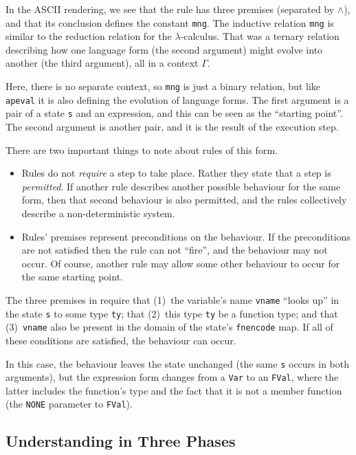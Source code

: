 \documentclass[11pt]{article}
\begin{document}
In the ASCII rendering, we see that the rule has three premises
(separated by $\land$), and that its conclusion defines the constant
\texttt{mng}.  The inductive relation \texttt{mng} is similar to the
reduction relation for the $\lambda$-calculus. That was a ternary
relation describing how one language form (the second argument) might
evolve into another (the third argument), all in a context $\Gamma$.

Here, there is no separate context, so \texttt{mng} is just a binary
relation, but like \texttt{apeval} it is also defining the evolution
of language forms.  The first argument is a pair of a state \texttt{s}
and an expression, and this can be seen as the ``starting point''.  The
second argument is another pair, and it is the result of the execution
step.

There are two important things to note about rules of this form.
\begin{itemize}
\item Rules do not \emph{require} a step to take place.  Rather they
  state that a step is \emph{permitted}.  If another rule describes
  another possible behaviour for the same form, then that second
  behaviour is also permitted, and the rules collectively describe a
  non-deterministic system.
\item Rules' premises represent preconditions on the behaviour.  If
  the preconditions are not satisfied then the rule can not ``fire'',
  and the behaviour may not occur.  Of course, another rule may allow
  some other behaviour to occur for the same starting point.
\end{itemize}

The three premises in  require that (1)~the
variable's name \texttt{vname} ``looks up'' in the state \texttt{s} to
some type \texttt{ty}; that (2)~this type \texttt{ty} be a function
type; and that (3)~\texttt{vname} also be present in the domain of the
state's \texttt{fnencode} map.  If all of these conditions are
satisfied, the behaviour can occur.

In this case, the behaviour leaves the state unchanged (the same
\texttt{s} occurs in both arguments), but the expression form changes
from a \texttt{Var} to an \texttt{FVal}, where the latter includes the
function's type and the fact that it is not a member function (the
\texttt{NONE} parameter to \texttt{FVal}).



\subsection{Understanding \cpp{} in Three Phases}
\label{sec:intro-three-phases}
\end{document}
